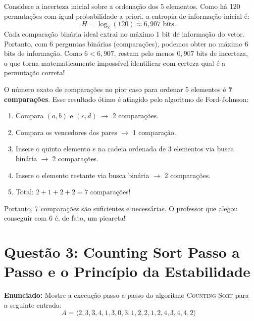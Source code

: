 \documentclass[11pt,a4paper]{article}
\begin{document}
\begin{teoria}
Considere a incerteza inicial sobre a ordenação dos 5 elementos. Como há 120 permutações com igual probabilidade a priori, a entropia de informação inicial é:
\[
    H = \log_2(120) \approx 6{,}907 \text{ bits}.
\]
Cada comparação binária ideal extrai no máximo 1 bit de informação do vetor. Portanto, com 6 perguntas binárias (comparações), podemos obter no máximo 6 bits de informação. Como $6 < 6{,}907$, restam pelo menos $0{,}907$ bits de incerteza, o que torna matematicamente impossível identificar com certeza qual é a permutação correta!
\end{teoria}

\begin{dica}[Quantas comparações são realmente necessárias para $n=5$?]
O número exato de comparações no pior caso para ordenar 5 elementos é \textbf{7 comparações}. Esse resultado ótimo é atingido pelo algoritmo de Ford-Johnson:
\begin{enumerate}
    \item Compara $(a, b)$ e $(c, d)$ $\rightarrow$ 2 comparações.
    \item Compara os vencedores dos pares $\rightarrow$ 1 comparação.
    \item Insere o quinto elemento $e$ na cadeia ordenada de 3 elementos via busca binária $\rightarrow$ 2 comparações.
    \item Insere o elemento restante via busca binária $\rightarrow$ 2 comparações.
    \item Total: $2 + 1 + 2 + 2 = 7$ comparações!
\end{enumerate}
Portanto, 7 comparações são suficientes e necessárias. O professor que alegou conseguir com 6 é, de fato, um picareta!
\end{dica}

\vspace{0.4cm}

\section*{Questão 3: Counting Sort Passo a Passo e o Princípio da Estabilidade}

\textbf{Enunciado:} Mostre a execução passo-a-passo do algoritmo \textsc{Counting Sort} para a seguinte entrada:
\[
A = \langle 2, 3, 3, 4, 1, 3, 0, 3, 1, 2, 2, 1, 2, 4, 3, 4, 4, 2 \rangle
\]
\end{document}
